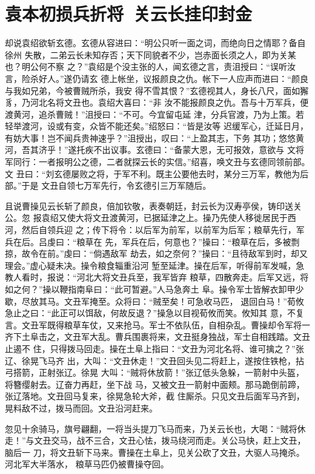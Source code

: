 \chapter{袁本初损兵折将~关云长挂印封金}

却说袁绍欲斩玄德。玄德从容进曰：“明公只听一面之词，而绝向日之情耶？备自徐州
失散，二弟云长未知存否；天下同貌者不少，岂赤面长须之人，即为关某也？明公何不察
之？”袁绍是个没主张的人，闻玄德之言，责沮授曰：“误听汝言，险杀好人。”遂仍请玄
德上帐坐，议报颜良之仇。帐下一人应声而进曰：“颜良与我如兄弟，今被曹贼所杀，我安
得不雪其恨？”玄德视其人，身长八尺，面如獬豸，乃河北名将文丑也。袁绍大喜曰：“非
汝不能报颜良之仇。吾与十万军兵，便渡黄河，追杀曹贼！”沮授曰：“不可。今宜留屯延
津，分兵官渡，乃为上策。若轻举渡河，设或有变，众皆不能还矣。”绍怒曰：“皆是汝等
迟缓军心，迁延日月，有妨大事！岂不闻兵贵神速乎？”沮授出，叹曰：“上盈其志，下务
其功；悠悠黄河，吾其济乎！”遂托疾不出议事。玄德曰：“备蒙大恩，无可报效，意欲与
文将军同行：一者报明公之德，二者就探云长的实信。”绍喜，唤文丑与玄德同领前部。文
丑曰：“刘玄德屡败之将，于军不利。既主公要他去时，某分三万军，教他为后部。”于是
文丑自领七万军先行，令玄德引三万军随后。

且说曹操见云长斩了颜良，倍加钦敬，表奏朝廷，封云长为汉寿亭侯，铸印送关公。忽
报袁绍又使大将文丑渡黄河，已据延津之上。操乃先使人移徙居民于西河，然后自领兵迎
之；传下将令：以后军为前军，以前军为后军；粮草先行，军兵在后。吕虔曰：“粮草在
先，军兵在后，何意也？”操曰：“粮草在后，多被剽掠，故令在前。”虔曰：“倘遇敌军
劫去，如之奈何？”操曰：“且待敌军到时，却又理会。”虚心疑未决。操令粮食辎重沿河
堑至延津。操在后军，听得前军发喊，急教人看时，报说：“河北大将文丑兵至，我军皆弃
粮草，四散奔走。后军又远，将如之何？”操以鞭指南阜曰：“此可暂避。”人马急奔土
阜。操令军士皆解衣卸甲少歇，尽放其马。文丑军掩至。众将曰：“贼至矣！可急收马匹，
退回白马！”荀攸急止之曰：“此正可以饵敌，何故反退？”操急以目视荀攸而笑。攸知其
意，不复言。文丑军既得粮草车仗，又来抢马。军士不依队伍，自相杂乱。曹操却令军将一
齐下土阜击之，文丑军大乱。曹兵围裹将来，文丑挺身独战，军士自相践踏。文丑止遏不
住，只得拨马回走。操在土阜上指曰：“文丑为河北名将、谁可擒之？”张辽、徐晃飞马齐
出，大叫：“文丑休走！”文丑回头见二将赶上，遂按住铁枪，拈弓搭箭，正射张辽。徐晃
大叫：“贼将休放箭！”张辽低头急躲，一箭射中头盔，将簪缨射去。辽奋力再赶，坐下战
马，又被文丑一箭射中面颊。那马跪倒前蹄，张辽落地。文丑回马复来，徐晃急轮大斧，截
住厮杀。只见文丑后面军马齐到，晃料敌不过，拨马而回。文丑沿河赶来。

忽见十余骑马，旗号翩翻，一将当头提刀飞马而来，乃关云长也，大喝：“贼将休
走！”与文丑交马，战不三合，文丑心怯，拨马绕河而走。关公马快，赶上文丑，脑后一
刀，将文丑斩下马来。曹操在土阜上，见关公砍了文丑，大驱人马掩杀。河北军大半落水，
粮草马匹仍被曹操夺回。


